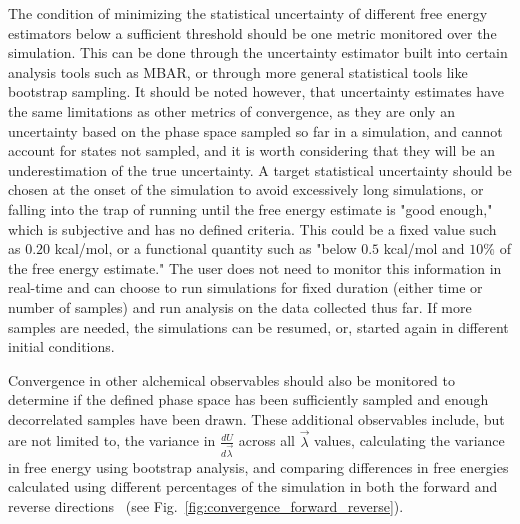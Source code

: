 \documentclass[9pt,bestpractices,pubversion]{livecoms}
\begin{document}
The condition of minimizing the statistical uncertainty of different free energy estimators below a sufficient threshold should be one metric monitored over the simulation. This can be done through the uncertainty estimator built into certain analysis tools such as MBAR, or through more general statistical tools like bootstrap sampling. It should be noted however, that uncertainty estimates have the same limitations as other metrics of convergence, as they are only an uncertainty based on the phase space sampled so far in a simulation, and cannot account for states not sampled, and it is worth considering that they will be an underestimation of the true uncertainty.
A target statistical uncertainty should be chosen at the onset of the simulation to avoid excessively long simulations, or falling into the trap of running until the free energy estimate is "good enough," which is subjective and has no defined criteria. This could be a fixed value such as $0.20$ kcal/mol, or a functional quantity such as "below $0.5$ kcal/mol and $10\%$ of the free energy estimate." The user does not need to monitor this information in real-time and can choose to run simulations for fixed duration (either time or number of samples) and run analysis on the data collected thus far. If more samples are needed, the simulations can be resumed, or, started again in different initial conditions. 

Convergence in other alchemical observables should also be monitored to determine if the defined phase space has been sufficiently sampled and enough decorrelated samples have been drawn. These additional observables include, but are not limited to, the variance in $\frac{dU}{d\vec{\lambda}}$ across all $\vec{\lambda}$ values, calculating the variance in free energy using bootstrap analysis, and comparing differences in free energies calculated using different percentages of the simulation in both the forward and reverse directions~\cite{klimovich2015guidelines} (see Fig.~\ref{fig:convergence_forward_reverse}).
\end{document}
